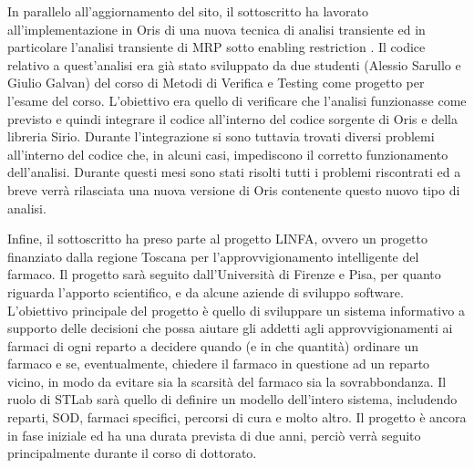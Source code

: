 \documentclass{article}
\begin{document}
    In parallelo all'aggiornamento del sito, il sottoscritto ha lavorato all'implementazione in Oris di una nuova tecnica di analisi transiente ed in particolare l'analisi transiente di MRP sotto enabling restriction \cite{german1995transient}. Il codice relativo a quest'analisi era già stato sviluppato da due studenti (Alessio Sarullo e Giulio Galvan) del corso di Metodi di Verifica e Testing come progetto per l'esame del corso. L'obiettivo era quello di verificare che l'analisi funzionasse come previsto e quindi integrare il codice all'interno del codice sorgente di Oris e della libreria Sirio. Durante l'integrazione si sono tuttavia trovati diversi problemi all'interno del codice che, in alcuni casi, impediscono il corretto funzionamento dell'analisi. Durante questi mesi sono stati risolti tutti i problemi riscontrati ed a breve verrà rilasciata una nuova versione di Oris contenente questo nuovo tipo di analisi.
    
    Infine, il sottoscritto ha preso parte al progetto LINFA, ovvero un progetto finanziato dalla regione Toscana per l'approvvigionamento intelligente del farmaco. Il progetto sarà seguito dall'Università di Firenze e Pisa, per quanto riguarda l'apporto scientifico, e da alcune aziende di sviluppo software. L'obiettivo principale del progetto è quello di sviluppare un sistema informativo a supporto delle decisioni che possa aiutare gli addetti agli approvvigionamenti ai farmaci di ogni reparto a decidere quando (e in che quantità) ordinare un farmaco e se, eventualmente, chiedere il farmaco in questione ad un reparto vicino, in modo da evitare sia la scarsità del farmaco sia la sovrabbondanza. Il ruolo di STLab sarà quello di definire un modello dell'intero sistema, includendo reparti, SOD, farmaci specifici, percorsi di cura e molto altro. Il progetto è ancora in fase iniziale ed ha una durata prevista di due anni, perciò verrà seguito principalmente durante il corso di dottorato.
    
    \clearpage
    
	
	
\end{document}
